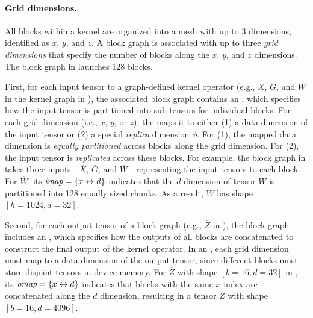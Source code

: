 \paragraph{Grid dimensions.} All blocks within a kernel are organized into a mesh with up to 3 dimensions, identified as $x$, $y$, and $z$. A block graph is associated with up to three {\em grid dimensions} that specify the number of blocks along the $x$, $y$, and $z$ dimensions. The block graph in  launches $128$ blocks.
%

First, for each input tensor to a graph-defined kernel operator (e.g., $X$, $G$, and $W$ in the kernel graph in ), the associated block graph contains an {\em \imap}, which specifies how the input tensor is partitioned into sub-tensors for individual blocks.
%
For each grid dimension (i.e., $x$, $y$, or $z$),
the  maps it to either (1) a data dimension of the input tensor or (2) a special {\em replica} dimension $\phi$.
For (1), the mapped data dimension is {\em equally partitioned} across blocks along the grid dimension. For (2), the input tensor is {\em replicated} across these blocks.
%
For example, the block graph in  takes three inputs---$\overline{X}$, $\overline{G}$, and $\overline{W}$---representing the input tensors to each block.
For $\overline{W}$, its $\mbox{\rm\em imap}=\{x\leftrightarrow d\}$ indicates that the $d$ dimension of tensor $W$ is partitioned into 128 equally sized chunks. As a result, $\overline{W}$ has shape $[h=1024, d=32]$.

Second, for each output tensor of a block graph (e.g., $\overline{Z}$ in ), the block graph includes an {\em \omap}, which specifies how the outputs of all blocks are concatenated to construct the final output of the kernel operator.
%
In an \omap, each grid dimension must map to a data dimension of the output tensor, since different blocks must store disjoint tensors in device memory.
%
For $\overline{Z}$ with shape $[b=16, d=32]$ in , its $\mbox{\rm\em omap} =\{x\leftrightarrow d\}$ indicates that blocks with the same $x$ index are concatenated along the $d$ dimension, resulting in a tensor $Z$ with shape $[b=16, d=4096]$.
%

